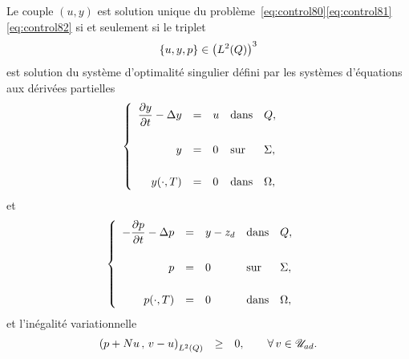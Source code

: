 \begin{theoreme}\label{thm:sosingulier}%
    Le couple $(u,y)$ est solution unique du
    problème~\eqref{eq:control80}\eqref{eq:control81}\eqref{eq:control82}
    si et seulement si le triplet
    \begin{equation*}
        \left\{{%
            u,y,p
        }\right\}\in {\left({\Ldeux{Q}}\right)}^{3}
    \end{equation*}
    est solution du système d'optimalité singulier défini par les systèmes
    d'équations aux dérivées partielles
    \begin{equation}
        \begin{cases}\displaystyle
            \begin{array}{rclll}
                \dfrac{\partial{}y}{\partial{}t} - \Delta y & = & u & \text{dans} & Q,\\
                \\
                y & = & 0 & \text{sur} & \Sigma,\\
                \\
                {y}\!\left({\cdot,T}\right) & = & 0 & \text{dans} & \Omega,
            \end{array}
        \end{cases}
    \end{equation}
    et
    \begin{equation}
        \begin{cases}\displaystyle
            \begin{array}{rclll}
                -\dfrac{\partial{}p}{\partial{}t} - \Delta p & = & y - z_{d} & \text{dans} &
                Q,\\
                \\
                p & = & 0 & \text{sur} & \Sigma,\\
                \\
                {p}\!\left({\cdot,T}\right) & = & 0 & \text{dans} & \Omega,
            \end{array}
        \end{cases}
    \end{equation}
    et l'inégalité variationnelle
    \begin{equation}
        \begin{array}{rcll}
            \scalaireq{%
                p + Nu
            }{%
                v - u
            } & \geq & 0,\qquad\forall\,v\in\uad.
        \end{array}
    \end{equation}
\end{theoreme}
